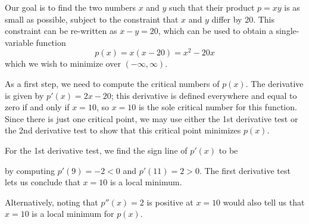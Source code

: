 \documentclass[11pt]{article}
\begin{document}
\begin{enumerate}
\vspace{3cm}

{\color{blue}
Our goal is to find the two numbers $x$ and $y$ such that their product $p=xy$ is as small as possible, subject to the constraint that $x$ and $y$ differ by 20. This constraint can be re-written as $x-y=20$, which can be used to obtain a single-variable function
\[
    p(x) = x(x-20) = x^2 - 20x
\]
which we wish to minimize over $(-\infty, \infty)$. 

As a first step, we need to compute the critical numbers of $p(x)$. The derivative is given by $p'(x) = 2x-20$; this derivative is defined everywhere and equal to zero if and only if $x=10$, so $x=10$ is the sole critical number for this function. Since there is just one critical point, we may use either the 1st derivative test or the 2nd derivative test to show that this critical point minimizes $p(x)$.

For the 1st derivative test, we find the sign line of $p'(x)$ to be
\begin{center}
\end{center}
by computing $p'(9) = -2<0$ and $p'(11)=2>0$. The first derivative test lets us conclude that $x=10$ is a local minimum.

Alternatively, noting that $p''(x) = 2$ is positive at $x=10$ would also tell us that $x=10$ is a local minimum for $p(x)$.

}
\end{enumerate}
\end{document}
